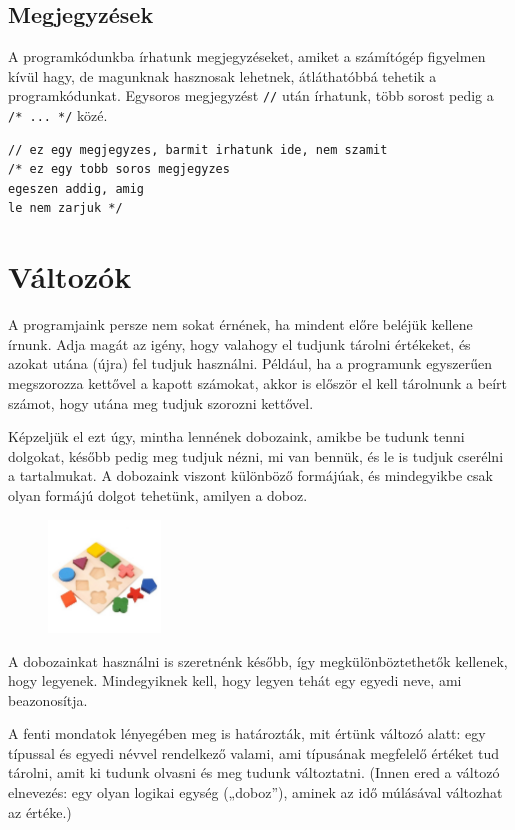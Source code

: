 \documentclass[a4paper]{article}
\begin{document}
\subsection{Megjegyzések}
A programkódunkba írhatunk megjegyzéseket, amiket a számítógép figyelmen kívül hagy, de magunknak hasznosak lehetnek, átláthatóbbá tehetik a programkódunkat. Egysoros megjegyzést \lstinline{//} után írhatunk, több sorost pedig a \lstinline{/* ... */} közé.

\begin{lstlisting}[caption=Megjegyzések, label=lst:comments]
// ez egy megjegyzes, barmit irhatunk ide, nem szamit
/* ez egy tobb soros megjegyzes
egeszen addig, amig
le nem zarjuk */
\end{lstlisting}

\section{Változók}
A programjaink persze nem sokat érnének, ha mindent előre beléjük kellene írnunk. Adja magát az igény, hogy valahogy el tudjunk tárolni értékeket, és azokat utána (újra) fel tudjuk használni. Például, ha a programunk egyszerűen megszorozza kettővel a kapott számokat, akkor is először el kell tárolnunk a beírt számot, hogy utána meg tudjuk szorozni kettővel.

Képzeljük el ezt úgy, mintha lennének dobozaink, amikbe be tudunk tenni dolgokat, később pedig meg tudjuk nézni, mi van bennük, és le is tudjuk cserélni a tartalmukat. A dobozaink viszont különböző formájúak, és mindegyikbe csak olyan formájú dolgot tehetünk, amilyen a doboz.

\begin{figure}[h!]
	\centering
	\includegraphics[width=3cm]{figures/variables.jpg}
\end{figure}

A dobozainkat használni is szeretnénk később, így megkülönböztethetők kellenek, hogy legyenek. Mindegyiknek kell, hogy legyen tehát egy egyedi neve, ami beazonosítja.

A fenti mondatok lényegében meg is határozták, mit értünk változó alatt: egy típussal és egyedi névvel rendelkező valami, ami típusának megfelelő értéket tud tárolni, amit ki tudunk olvasni és meg tudunk változtatni. (Innen ered a változó elnevezés: egy olyan logikai egység („doboz”), aminek az idő múlásával változhat az értéke.)
\end{document}

